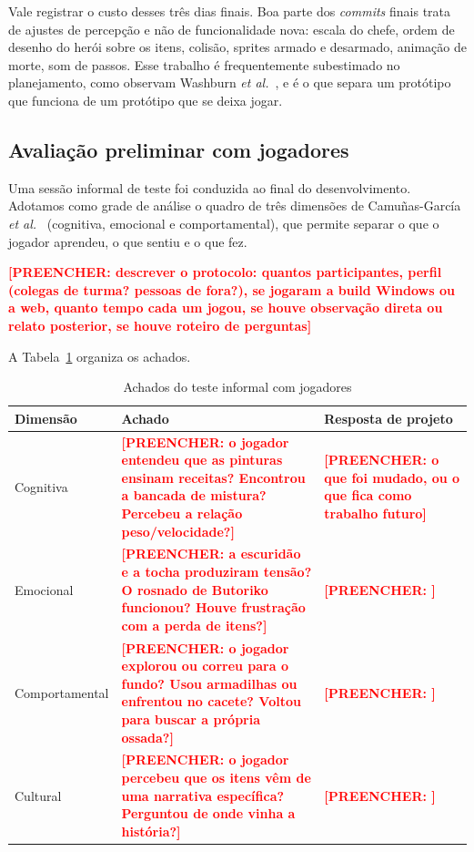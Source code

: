 \documentclass[conference]{IEEEtran}
\newcommand{\preencher}[1]{\textcolor{red}{\textbf{[PREENCHER: #1]}}}
\begin{document}
Vale registrar o custo desses três dias finais. Boa parte dos \textit{commits} finais
trata de ajustes de percepção e não de funcionalidade nova: escala do chefe, ordem de
desenho do herói sobre os itens, colisão, sprites armado e desarmado, animação de morte,
som de passos. Esse trabalho é frequentemente subestimado no planejamento, como observam
Washburn \textit{et al.}~\cite{washburn2016}, e é o que separa um protótipo que funciona
de um protótipo que se deixa jogar.

\subsection{Avaliação preliminar com jogadores}
\label{sec:playtest}

Uma sessão informal de teste foi conduzida ao final do desenvolvimento. Adotamos como
grade de análise o quadro de três dimensões de Camuñas-García
\textit{et al.}~\cite{camunas2023} (cognitiva, emocional e comportamental), que permite separar o que o jogador aprendeu, o que sentiu e o que fez.

\preencher{descrever o protocolo: quantos participantes, perfil (colegas de turma?
pessoas de fora?), se jogaram a build Windows ou a web, quanto tempo cada um jogou, se
houve observação direta ou relato posterior, se houve roteiro de perguntas}

A Tabela~\ref{tab:playtest} organiza os achados.

\begin{table}[t]
\caption{Achados do teste informal com jogadores}
\label{tab:playtest}
\centering
\footnotesize
\begin{tabular}{p{1.35cm}p{3.0cm}p{2.6cm}}
\toprule
\textbf{Dimensão} & \textbf{Achado} & \textbf{Resposta de projeto} \\
\midrule
Cognitiva
& \preencher{o jogador entendeu que as pinturas ensinam receitas? Encontrou a bancada de mistura? Percebeu a relação peso/velocidade?}
& \preencher{o que foi mudado, ou o que fica como trabalho futuro} \\[3pt]
Emocional
& \preencher{a escuridão e a tocha produziram tensão? O rosnado de Butoriko funcionou? Houve frustração com a perda de itens?}
& \preencher{} \\[3pt]
Comportamental
& \preencher{o jogador explorou ou correu para o fundo? Usou armadilhas ou enfrentou no cacete? Voltou para buscar a própria ossada?}
& \preencher{} \\[3pt]
Cultural
& \preencher{o jogador percebeu que os itens vêm de uma narrativa específica? Perguntou de onde vinha a história?}
& \preencher{} \\
\bottomrule
\end{tabular}
\end{table}
\end{document}
